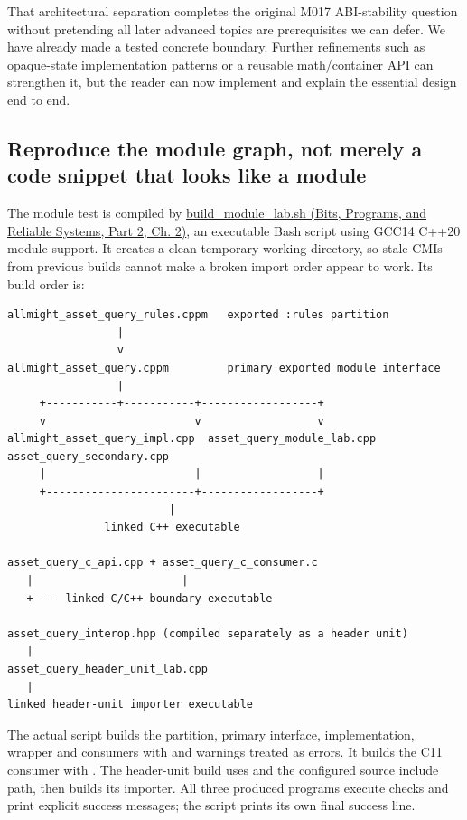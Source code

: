 That architectural separation completes the original M017 ABI-stability question without pretending all later advanced topics are prerequisites we can defer. We have already made a tested concrete boundary. Further refinements such as opaque-state implementation patterns or a reusable math/container API can strengthen it, but the reader can now implement and explain the essential design end to end.

\subsection{Reproduce the module graph, not merely a code snippet that looks like a module}\label{05-engine-i-ch006-reproduce-the-module-graph-not-merely-a-code-snippet-that-looks-like-a-module}

\hypertarget{05-engine-i-ch006-reproduce-the-module-graph-not-merely-a-code-snippet-that-looks-like-a-module}{}

The module test is compiled by \href{../01-Bits-Programs-and-Reliable-Systems-P02/main.pdf\#nameddest=source-file-e1b7c3e4f52da0e7c9c36a41}{build\_module\_lab.sh (Bits, Programs, and Reliable Systems, Part 2, Ch. 2)}, an executable Bash script using GCC14 C++20 module support. It creates a clean temporary working directory, so stale CMIs from previous builds cannot make a broken import order appear to work. Its build order is:

\begin{verbatim}
allmight_asset_query_rules.cppm   exported :rules partition
                 |
                 v
allmight_asset_query.cppm         primary exported module interface
                 |
     +-----------+-----------+------------------+
     v                       v                  v
allmight_asset_query_impl.cpp  asset_query_module_lab.cpp  asset_query_secondary.cpp
     |                       |                  |
     +-----------------------+------------------+
                         |
               linked C++ executable

asset_query_c_api.cpp + asset_query_c_consumer.c
   |                       |
   +---- linked C/C++ boundary executable

asset_query_interop.hpp (compiled separately as a header unit)
   |
asset_query_header_unit_lab.cpp
   |
linked header-unit importer executable
\end{verbatim}

The actual script builds the partition, primary interface, implementation, wrapper and consumers with  and warnings treated as errors. It builds the C11 consumer with . The header-unit build uses  and the configured source include path, then builds its importer. All three produced programs execute checks and print explicit success messages; the script prints its own final success line.

